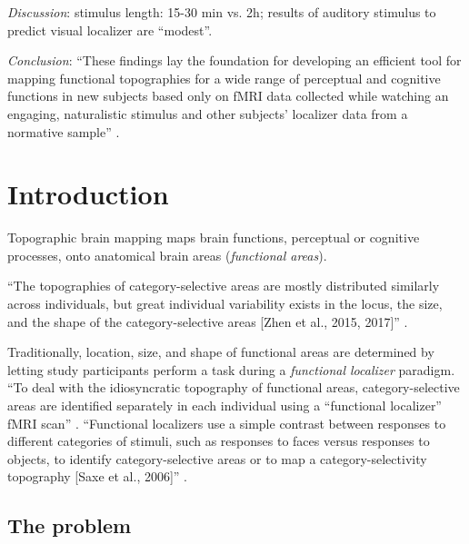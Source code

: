 %
\textit{Discussion}: stimulus length: 15-30 min vs. 2h;  results of auditory stimulus to predict visual localizer are ``modest''.

%
\textit{Conclusion}: ``These findings lay the foundation for developing an
efficient tool for mapping functional topographies for a wide range of
perceptual and cognitive functions in new subjects based only on fMRI data
collected while watching an engaging, naturalistic stimulus and other subjects'
localizer data from a normative sample'' \citep{jiahui2020predicting}.


\section{Introduction}



Topographic brain mapping maps brain functions, perceptual or cognitive
processes, onto anatomical brain areas (\textit{functional areas}).

%
``The topographies of category-selective areas are mostly distributed similarly
across individuals, but great individual variability exists in the locus, the
size, and the shape of the category-selective areas [Zhen et al., 2015, 2017]''
\citep{jiahui2020predicting}.

Traditionally, location, size, and shape of functional areas are determined by
letting study participants perform a task during a \textit{functional localizer}
paradigm.
%
``To deal with the idiosyncratic topography of functional areas,
category-selective areas are identified separately in each individual using a
``functional localizer'' fMRI scan'' \citep{jiahui2020predicting}.
%
``Functional localizers use a simple contrast between responses to different
categories of stimuli, such as responses to faces versus responses to objects,
to identify category-selective areas or to map a category-selectivity topography
[Saxe et al., 2006]'' \citep{jiahui2020predicting}.


\subsection{The problem}

